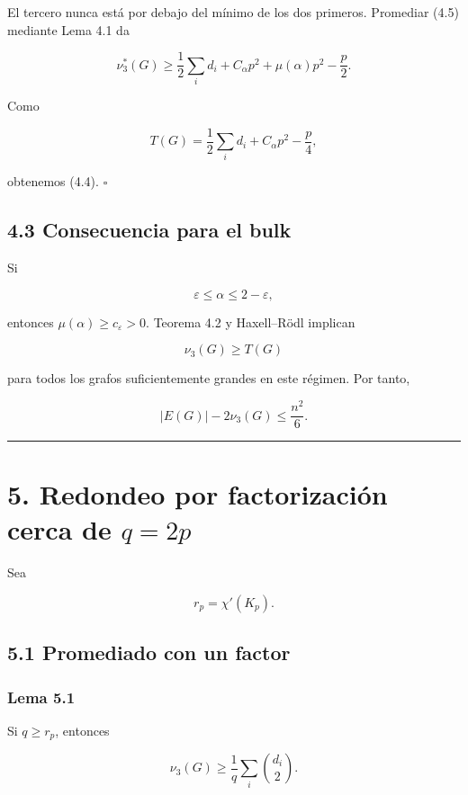 \documentclass[
  11pt,
]{article}
\begin{document}
El tercero nunca está por debajo del mínimo de los dos primeros.
Promediar (4.5) mediante Lema 4.1 da

\[
\nu_3^*(G)
\ge
\frac12\sum_i d_i+C_\alpha p^2+\mu(\alpha)p^2-\frac p2.
\]

Como

\[
T(G)=\frac12\sum_i d_i+C_\alpha p^2-\frac p4,
\]

obtenemos (4.4). \(\square\)

\subsection{4.3 Consecuencia para el
bulk}\label{consecuencia-para-el-bulk}

Si

\[
\varepsilon\le\alpha\le2-\varepsilon,
\]

entonces \(\mu(\alpha)\ge c_\varepsilon>0\). Teorema 4.2 y Haxell--Rödl
implican

\[
\nu_3(G)\ge T(G)
\]

para todos los grafos suficientemente grandes en este régimen. Por
tanto,

\[
|E(G)|-2\nu_3(G)
\le
\frac{n^2}{6}.
\tag{4.6}
\]

\begin{center}\rule{0.5\linewidth}{0.5pt}\end{center}

\section{\texorpdfstring{5. Redondeo por factorización cerca de
\(q=2p\)}{5. Redondeo por factorización cerca de q=2p}}\label{redondeo-por-factorizaciuxf3n-cerca-de-q2p}

Sea

\[
r_p=\chi'(K_p).
\]

\subsection{5.1 Promediado con un
factor}\label{promediado-con-un-factor}

\subsubsection{Lema 5.1}\label{lema-5.1}

Si \(q\ge r_p\), entonces

\[
\boxed{
\nu_3(G)
\ge
\frac1q\sum_i\binom{d_i}{2}.
}
\tag{5.1}
\]
\end{document}
